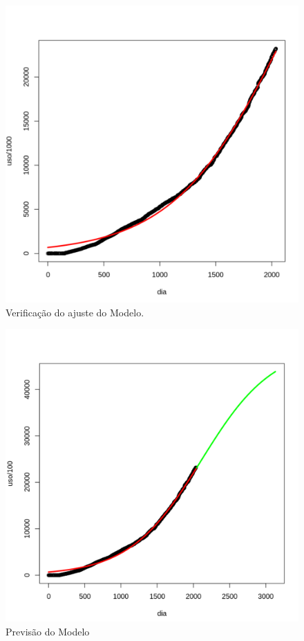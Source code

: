 \documentclass[a4paper,12pt]{article}
\begin{document}
\begin{figure}[h!tb]
     \centering
     \includegraphics[scale=0.45]{RNL_02.png}
     \caption{Verificação do ajuste do Modelo.}
     \label{figAjs}
\end{figure}

\begin{figure}[h!tb]
     \centering
     \includegraphics[scale=0.45]{RNL_03.png}
     \caption{Previsão do Modelo}
     \label{figModel}
\end{figure}
\end{document}
